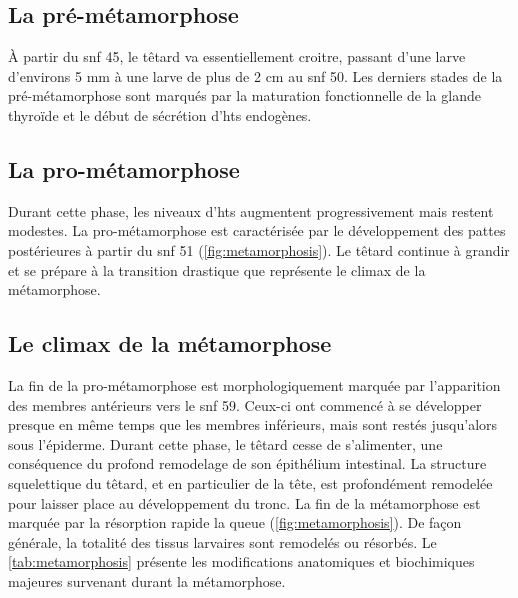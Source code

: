 \documentclass[../main.tex]{subfiles}
\begin{document}
\subsection{La pré-métamorphose}
À partir du \gls{snf} 45, le têtard va essentiellement croitre, passant d'une larve d'environs 5 mm à une larve de plus de 2 cm au \gls{snf} 50.
Les derniers stades de la pré-métamorphose sont marqués par la maturation fonctionnelle de la glande thyroïde et le début de sécrétion d'\glspl{ht} endogènes.

\subsection{La pro-métamorphose}
Durant cette phase, les niveaux d'\glspl{ht} augmentent progressivement mais restent modestes.
La pro-métamorphose est caractérisée par le développement des pattes postérieures à partir du \gls{snf} 51 (\autoref{fig:metamorphosis}).
Le têtard continue à grandir et se prépare à la transition drastique que représente le climax de la métamorphose.



\subsection{Le climax de la métamorphose}
La fin de la pro-métamorphose est morphologiquement marquée par l'apparition des membres antérieurs vers le \gls{snf} 59.
Ceux-ci ont commencé à se développer presque en même temps que les membres inférieurs, mais sont restés jusqu'alors sous l'épiderme.
Durant cette phase, le têtard cesse de s'alimenter, une conséquence du profond remodelage de son épithélium intestinal.
La structure squelettique du têtard, et en particulier de la tête, est profondément remodelée pour laisser place au développement du tronc.
La fin de la métamorphose est marquée par la résorption rapide la queue (\autoref{fig:metamorphosis}).
De façon générale, la totalité des tissus larvaires sont remodelés ou résorbés. Le \autoref{tab:metamorphosis} présente les modifications anatomiques et biochimiques majeures survenant durant la métamorphose.


\end{document}
